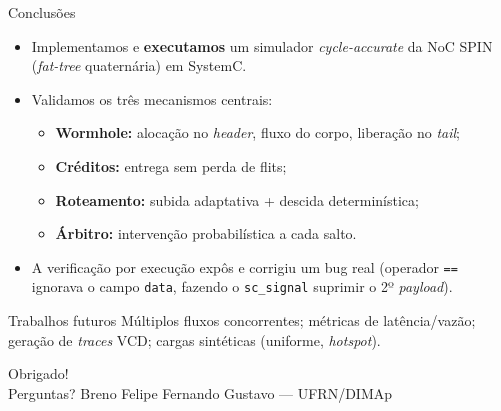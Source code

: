\documentclass[aspectratio=169]{beamer}
\begin{document}
\begin{frame}{Conclusões}
  \begin{itemize}
    \item Implementamos e \textbf{executamos} um simulador \emph{cycle-accurate}
    da NoC SPIN (\emph{fat-tree} quaternária) em SystemC.
    \item Validamos os três mecanismos centrais:
    \begin{itemize}
      \item \textbf{Wormhole:} alocação no \emph{header}, fluxo do corpo,
      liberação no \emph{tail};
      \item \textbf{Créditos:} entrega sem perda de flits;
      \item \textbf{Roteamento:} subida adaptativa + descida determinística;
      \item \textbf{Árbitro:} intervenção probabilística a cada salto.
    \end{itemize}
    \item A verificação por execução \alert{expôs e corrigiu um bug real}
    (operador \texttt{==} ignorava o campo \texttt{data}, fazendo o
    \texttt{sc\_signal} suprimir o 2º \emph{payload}).
  \end{itemize}
  \vfill
  \begin{block}{Trabalhos futuros}
    Múltiplos fluxos concorrentes; métricas de latência/vazão; geração de
    \emph{traces} VCD; cargas sintéticas (uniforme, \emph{hotspot}).
  \end{block}
\end{frame}

\begin{frame}[plain]
  \centering
  \vfill
  {\Huge Obrigado!}\\[4mm]
  {\large Perguntas?}
  \vfill
  \small Breno \quad Felipe \quad Fernando \quad Gustavo --- UFRN/DIMAp
  \vfill
\end{frame}
\end{document}
